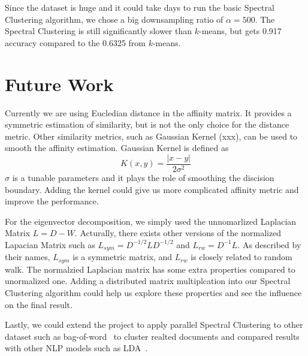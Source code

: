 \documentclass{acm_proc_article-sp}
\begin{document}
Since the dataset is huge and it could take days to run the basic Spectral Clustering algorithm, we chose a big downsampling ratio of $\alpha = 500$. The Spectral Clustering is still significantly slower than $k$-means, but gets 0.917 accuracy compared to the 0.6325 from $k$-means.

\section{Future Work}
Currently we are using Eucledian distance in the affinity matrix. It provides a symmetric estimation of similarity, but is not the only choice for the distance metric. Other similarity metrics, such as Gaussian Kernel (xxx), can be used to smooth the affinity estimation. Gaussian Kernel is defined as $$K(x, y) = \frac{|x - y|}{2\sigma^2}$$ $\sigma$ is a tunable parameters and it plays the role of smoothing the discision boundary. Adding the kernel could give us more complicated affinity metric and improve the performance.

For the eigenvector decomposition, we simply used the unnomarlized Laplacian Matrix $L = D - W$. Acturally, there exists other versions of the normalized Lapacian Matrix such as $L_{sym} = D^{-1/2}LD^{-1/2}$ and $L_{rw} = D^{-1}L$. As described by their names, $L_{sym}$ is a symmetric matrix, and $L_{rw}$ is closely related to random walk. The normalzied Laplacian matrix has some extra properties compared to unormalized one. Adding a distributed matrix multiplcation into our Spectral Clustering algorithm could help us explore these properties and see the influence on the final result.

Lastly, we could extend the project to apply parallel Spectral Clustering to other dataset such as bag-of-word~\cite{Lichman:2013} to cluster realted documents and compared results with other NLP models such as LDA~\cite{blei2003latent}.
\end{document}
